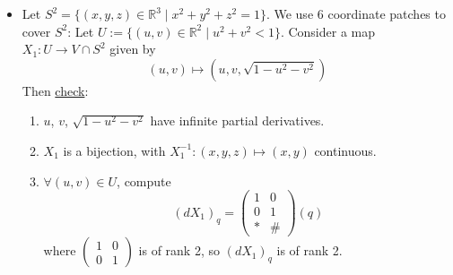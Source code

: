 \noindent\begin{itemize}
\item Let $S^2 = \{(x, y, z)\in\mathbb{R}^3 \mid x^2 + y^2 + z^2 = 1\}$. We use 6 coordinate patches to cover $S^2$: Let $U := \{(u, v)\in\mathbb{R}^2 \mid u^2 + v^2 < 1\}$. Consider a map $X_1: U\to V\cap S^2$ given by
\[
(u, v)\longmapsto\left(u, v, \sqrt{1 - u^2 - v^2}\right)
\]
Then \underline{check}:

\begin{enumerate}
\item $u$, $v$, $\sqrt{1-u^2-v^2}$ have infinite partial derivatives.
\item $X_1$ is a bijection, with $X_1^{-1}: (x, y, z)\mapsto(x, y)$ continuous.
\item $\forall (u, v)\in U$, compute
\[
(dX_1)_q = \begin{pmatrix}1 & 0\\ 0 & 1\\ * & \#\end{pmatrix}(q)
\]
where $\begin{pmatrix}1 & 0\\ 0 & 1\end{pmatrix}$ is of rank 2, so $(dX_1)_q$ is of rank 2.
\end{enumerate}


\end{itemize}
